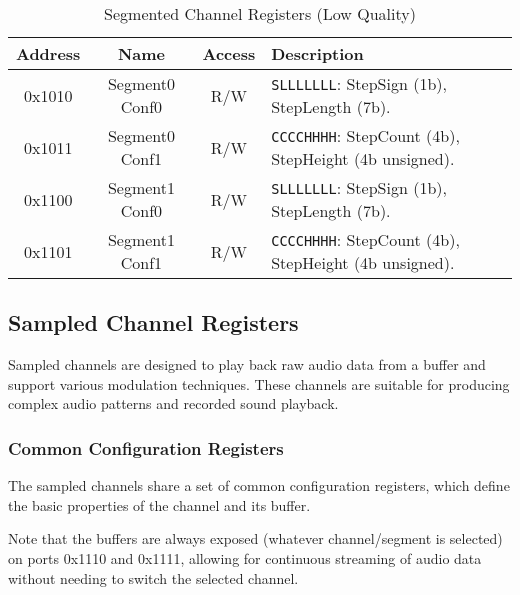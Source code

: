\begin{table}[H]
    \centering
    \begin{tabular}{|c|c|c|l|}
        \hline
        \textbf{Address} & \textbf{Name}        & \textbf{Access} & \textbf{Description} \\
        \hline
        0x1010 & Segment0 Conf0  & R/W   & \texttt{SLLLLLLL}: StepSign (1b), StepLength (7b). \\
        0x1011 & Segment0 Conf1  & R/W   & \texttt{CCCCHHHH}: StepCount (4b), StepHeight (4b unsigned). \\
        0x1100 & Segment1 Conf0  & R/W   & \texttt{SLLLLLLL}: StepSign (1b), StepLength (7b). \\
        0x1101 & Segment1 Conf1  & R/W   & \texttt{CCCCHHHH}: StepCount (4b), StepHeight (4b unsigned). \\
        \hline
    \end{tabular}
    \caption{Segmented Channel Registers (Low Quality)}
\end{table}

\subsection{Sampled Channel Registers}
Sampled channels are designed to play back raw audio data from a buffer and support various modulation techniques.
These channels are suitable for producing complex audio patterns and recorded sound playback.

\subsubsection{Common Configuration Registers}
The sampled channels share a set of common configuration registers, which define the basic properties of the channel and its buffer.

Note that the buffers are always exposed (whatever channel/segment is selected) on ports 0x1110 and 0x1111, allowing for continuous streaming of audio data without needing to switch the selected channel.

